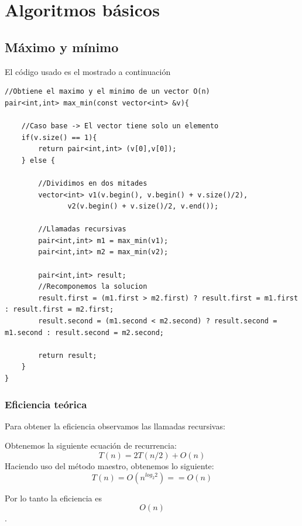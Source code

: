 \section{Algoritmos básicos}

\subsection{Máximo y mínimo}
El código usado es el mostrado a continuación

\begin{lstlisting}
//Obtiene el maximo y el minimo de un vector O(n)
pair<int,int> max_min(const vector<int> &v){

    //Caso base -> El vector tiene solo un elemento
    if(v.size() == 1){
        return pair<int,int> (v[0],v[0]);
    } else {

        //Dividimos en dos mitades
        vector<int> v1(v.begin(), v.begin() + v.size()/2),
               v2(v.begin() + v.size()/2, v.end());
        
        //Llamadas recursivas 
        pair<int,int> m1 = max_min(v1);
        pair<int,int> m2 = max_min(v2);

        pair<int,int> result;
        //Recomponemos la solucion
        result.first = (m1.first > m2.first) ? result.first = m1.first : result.first = m2.first;
        result.second = (m1.second < m2.second) ? result.second = m1.second : result.second = m2.second;

        return result;
    }
}
\end{lstlisting}

\subsubsection{Eficiencia teórica}

 Para obtener la eficiencia observamos las llamadas recursivas:

 Obtenemos la siguiente ecuación de recurrencia:
  \begin{equation}
      T(n) = 2T(n/2) + O(n)
  \end{equation}
  Haciendo uso del método maestro, obtenemos lo siguiente:
  \begin{equation}
      T(n) = O(n^{log_2{2}}) == O(n)
  \end{equation}
  
  Por lo tanto la eficiencia es
  \begin{equation} O(n) \end{equation}.
  


